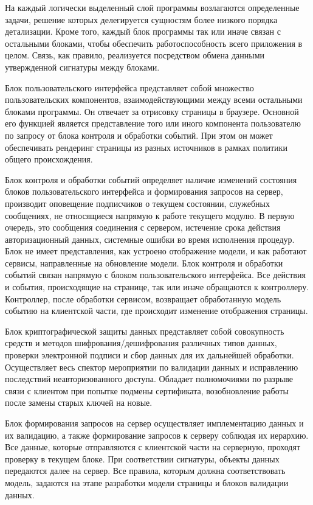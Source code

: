 На каждый логически выделенный слой программы возлагаются определенные задачи, решение которых делегируется сущностям более низкого порядка детализации. Кроме того, каждый блок программы так или иначе связан с остальными блоками, чтобы обеспечить работоспособность всего приложения в целом. Связь, как правило, реализуется посредством обмена данными утвержденной сигнатуры между блоками.

Блок пользовательского интерфейса представляет собой множество пользовательских компонентов, взаимодействующими между всеми остальными блоками программы. Он отвечает за отрисовку страницы в браузере. Основной его функцией является представление того или иного компонента пользователю по запросу от блока контроля и обработки событий. При этом он может обеспечивать рендеринг страницы из разных источников в рамках политики общего происхождения.

Блок контроля и обработки событий определяет наличие изменений состояния блоков пользовательского интерфейса и формирования запросов на сервер, производит оповещение подписчиков о текущем состоянии, служебных сообщениях, не относящиеся напрямую к работе текущего модулю. В первую очередь, это сообщения соединения с сервером, истечение срока действия авторизационный данных, системные ошибки во время исполнения процедур. Блок не имеет представления, как устроено отображение модели, и как работают сервисы, направленные на обновление модели. Блок контроля и обработки событий связан напрямую с блоком пользовательского интерфейса. Все действия и события, происходящие на странице, так или иначе обращаются к контроллеру. Контроллер, после обработки сервисом, возвращает обработанную модель событию на клиентской части, где происходит изменение отображения страницы.

Блок криптографической защиты данных представляет собой совокупность средств и методов шифрования/дешифрования различных типов данных, проверки электронной подписи и сбор данных для их дальнейшей обработки. Осуществляет весь спектор мероприятии по валидации данных и исправлению последствий неавторизованного доступа. Обладает полномочиями по разрыве связи с клиентом при попытке подмены сертификата, возобновление работы после замены старых ключей на новые.

Блок формирования запросов на сервер осуществляет имплементацию данных и их валидацию, а также формирование запросов к серверу соблюдая их иерархию. Все данные, которые отправляются с клиентской части на серверную, проходят проверку в текущем блоке. При соответствии сигнатуры, объекты данных передаются далее на сервер. Все правила, которым должна соответствовать модель, задаются на этапе разработки модели страницы и блоков валидации данных.

